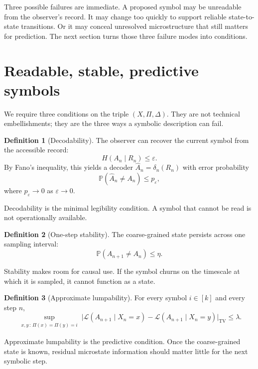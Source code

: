 \documentclass[11pt,a4paper]{article}
\theoremstyle{definition}
\newtheorem{definition}{Definition}
\theoremstyle{remark}
\newcommand{\TV}{\mathrm{TV}}
\newcommand{\Lc}{\mathcal{L}}
\begin{document}
Three possible failures are immediate. A proposed symbol may be unreadable from the observer's record. It may change too quickly to support reliable state-to-state transitions. Or it may conceal unresolved microstructure that still matters for prediction. The next section turns those three failure modes into conditions.

\section{Readable, stable, predictive symbols}\label{sec:conditions}

We require three conditions on the triple $(X,\Pi,\Delta)$. They are not technical embellishments; they are the three ways a symbolic description can fail.

\begin{definition}[Decodability]\label{def:decodability}
The observer can recover the current symbol from the accessible record:
\[
H(A_n \mid R_n) \leq \varepsilon.
\]
By Fano's inequality, this yields a decoder $\hat{A}_n = \delta_n(R_n)$ with error probability
\[
\mathbb{P}(\hat{A}_n \neq A_n) \leq p_\varepsilon,
\]
where $p_\varepsilon \to 0$ as $\varepsilon \to 0$.
\end{definition}

Decodability is the minimal legibility condition. A symbol that cannot be read is not operationally available.

\begin{definition}[One-step stability]\label{def:stability}
The coarse-grained state persists across one sampling interval:
\[
\mathbb{P}(A_{n+1} \neq A_n) \leq \eta.
\]
\end{definition}

Stability makes room for causal use. If the symbol churns on the timescale at which it is sampled, it cannot function as a state.

\begin{definition}[Approximate lumpability]\label{def:lumpability}
For every symbol $i \in [k]$ and every step $n$,
\begin{equation}\label{eq:lumpability}
\sup_{\substack{x,y\,:\,\Pi(x)=\Pi(y)=i}}
\bigl|\Lc(A_{n+1}\mid X_n=x)-\Lc(A_{n+1}\mid X_n=y)\bigr|_{\TV}
\leq \lambda.
\end{equation}
\end{definition}

Approximate lumpability is the predictive condition. Once the coarse-grained state is known, residual microstate information should matter little for the next symbolic step.
\end{document}
